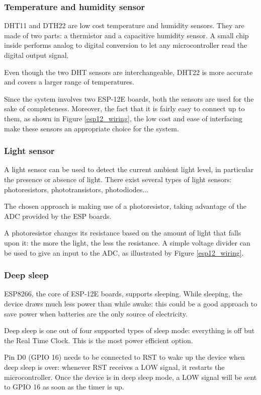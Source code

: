 \subsubsection{Temperature and humidity sensor}
DHT11 and DTH22 are low cost temperature and humidity sensors. They are made of two parts: a thermistor and a capacitive humidity sensor. A small chip inside performs analog to digital conversion to let any microcontroller read the digital output signal.

Even though the two DHT sensors are interchangeable, DHT22 is more accurate and covers a larger range of temperatures.

Since the system involves two ESP-12E boards, both the sensors are used for the sake of completeness. Moreover, the fact that it is fairly easy to connect up to them, as shown in Figure \ref{esp12_wiring}, the low cost and ease of interfacing make these sensors an appropriate choice for the system.

\subsubsection{Light sensor}
A light sensor can be used to detect the current ambient light level, in particular the presence or absence of light. There exist several types of light sensors: photoresistors, phototransistors, photodiodes...

The chosen approach is making use of a photoresistor, taking advantage of the ADC provided by the ESP boards.

A photoresistor changes its resistance based on the amount of light that falls upon it: the more the light, the less the resistance. A simple voltage divider can be used to give an input to the ADC, as illustrated by Figure \ref{esp12_wiring}.

\subsubsection{Deep sleep}
ESP8266, the core of ESP-12E boards, supports sleeping. While sleeping, the device draws much less power than while awake: this could be a good approach to save power when batteries are the only source of electricity.

Deep sleep is one out of four supported types of sleep mode: everything is off but the Real Time Clock. This is the most power efficient option.

Pin D0 (GPIO 16) needs to be connected to RST to wake up the device when deep sleep is over: whenever RST receives a LOW signal, it restarts the microcontroller. Once the device is in deep sleep mode, a LOW signal will be sent to GPIO 16 as soon as the timer is up.

